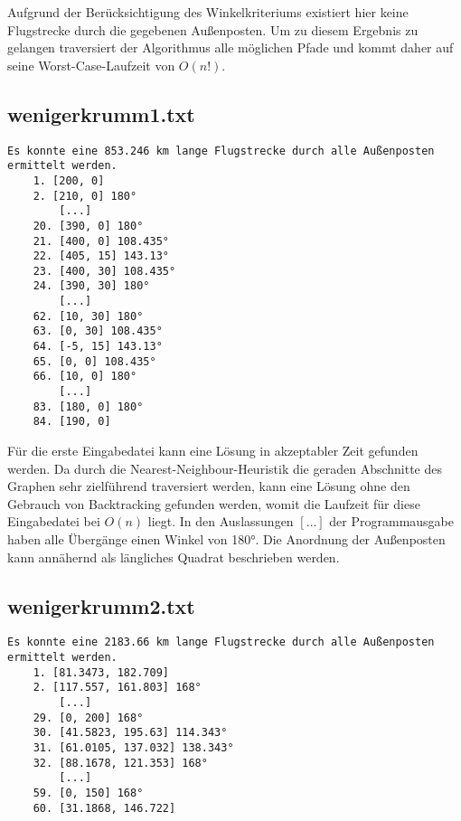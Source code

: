 \documentclass[a4paper,10pt,ngerman]{scrartcl}
\begin{document}
    Aufgrund der Berücksichtigung des Winkelkriteriums existiert hier keine Flugstrecke durch die gegebenen Außenposten.
    Um zu diesem Ergebnis zu gelangen traversiert der Algorithmus alle möglichen Pfade und kommt daher auf seine
    Worst-Case-Laufzeit von $O(n!)$.

    \subsection{wenigerkrumm1.txt}\label{subsec:wenigerkrumm1.txt}

    \begin{lstlisting}[frame=single, title=Programmausgabe wenigerkrumm1.txt, breaklines=true,label={lst:lstlisting6}]
    Es konnte eine 853.246 km lange Flugstrecke durch alle Außenposten ermittelt werden.
    1. [200, 0]
    2. [210, 0] 180°
        [...]
    20. [390, 0] 180°
    21. [400, 0] 108.435°
    22. [405, 15] 143.13°
    23. [400, 30] 108.435°
    24. [390, 30] 180°
        [...]
    62. [10, 30] 180°
    63. [0, 30] 108.435°
    64. [-5, 15] 143.13°
    65. [0, 0] 108.435°
    66. [10, 0] 180°
        [...]
    83. [180, 0] 180°
    84. [190, 0]
    \end{lstlisting}

    Für die erste Eingabedatei kann eine Lösung in akzeptabler Zeit gefunden werden.
    Da durch die Nearest-Neighbour-Heuristik die geraden Abschnitte des Graphen sehr zielführend traversiert werden,
    kann eine Lösung ohne den Gebrauch von Backtracking gefunden werden, womit die Laufzeit für diese Eingabedatei bei $O(n)$ liegt.
    In den Auslassungen $[\dots]$ der Programmausgabe haben alle Übergänge einen Winkel von 180°.
    Die Anordnung der Außenposten kann annähernd als längliches Quadrat beschrieben werden.

    \subsection{wenigerkrumm2.txt}\label{subsec:wenigerkrumm2.txt}

    \begin{lstlisting}[frame=single, title=Programmausgabe wenigerkrumm2.txt, breaklines=true,label={lst:lstlisting7}]
    Es konnte eine 2183.66 km lange Flugstrecke durch alle Außenposten ermittelt werden.
    1. [81.3473, 182.709]
    2. [117.557, 161.803] 168°
        [...]
    29. [0, 200] 168°
    30. [41.5823, 195.63] 114.343°
    31. [61.0105, 137.032] 138.343°
    32. [88.1678, 121.353] 168°
        [...]
    59. [0, 150] 168°
    60. [31.1868, 146.722]
    \end{lstlisting}
\end{document}
